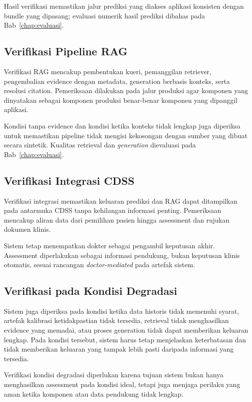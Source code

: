 Hasil verifikasi memastikan jalur prediksi yang diakses aplikasi konsisten dengan bundle yang dipasang; evaluasi numerik hasil prediksi dibahas pada Bab~\ref{chap:evaluasi}.

\subsection{Verifikasi Pipeline RAG}
\label{subsec:bab5-verifikasi-pipeline-rag}

Verifikasi RAG mencakup pembentukan kueri, pemanggilan retriever, pengembalian evidence dengan metadata, generation berbasis konteks, serta resolusi citation.
Pemeriksaan dilakukan pada jalur produksi agar komponen yang dinyatakan sebagai komponen produksi benar-benar komponen yang dipanggil aplikasi.

Kondisi tanpa evidence dan kondisi ketika konteks tidak lengkap juga diperiksa untuk memastikan pipeline tidak mengisi kekosongan dengan sumber yang dibuat secara
sintetik. Kualitas retrieval dan \textit{generation} dievaluasi pada Bab~\ref{chap:evaluasi}.

\subsection{Verifikasi Integrasi CDSS}
\label{subsec:bab5-verifikasi-integrasi-cdss}

Verifikasi integrasi memastikan keluaran prediksi dan RAG dapat ditampilkan pada antarmuka CDSS tanpa kehilangan informasi penting. Pemeriksaan mencakup
aliran data dari pemilihan pasien hingga assessment dan rujukan dokumen klinis.

Sistem tetap menempatkan dokter sebagai pengambil keputusan akhir. Assessment diperlakukan sebagai informasi pendukung, bukan keputusan klinis
otomatis, sesuai rancangan \textit{doctor-mediated} pada artefak sistem.

\subsection{Verifikasi pada Kondisi Degradasi}
\label{subsec:bab5-verifikasi-kondisi-degradasi}

Sistem juga diperiksa pada kondisi ketika data historis tidak memenuhi syarat, artefak kalibrasi ketidakpastian tidak tersedia, retrieval tidak menghasilkan
evidence yang memadai, atau proses generation tidak dapat memberikan keluaran lengkap. Pada kondisi tersebut, sistem harus tetap menjelaskan keterbatasan
dan tidak memberikan keluaran yang tampak lebih pasti daripada informasi yang tersedia.

Verifikasi kondisi degradasi diperlukan karena tujuan sistem bukan hanya menghasilkan assessment pada kondisi ideal, tetapi juga menjaga perilaku yang aman ketika
komponen atau data pendukung tidak lengkap.
